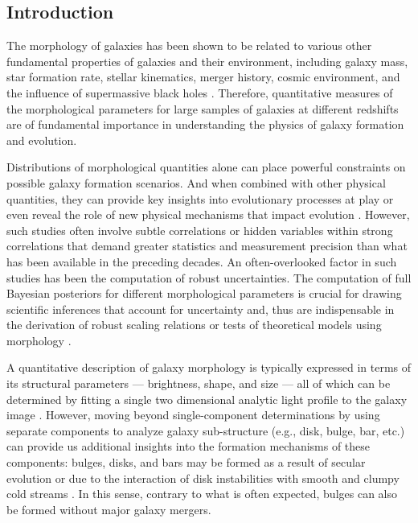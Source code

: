 \documentclass[linenumbers,twocolumn,twocolappendix]{aastex631}
\begin{document}
\begin{CJK*}{UTF8}{gbsn}
\section{Introduction} \label{sec:intro}

The morphology of galaxies has been shown to be related to various other fundamental properties of galaxies and their environment, including galaxy mass, star formation rate, stellar kinematics, merger history, cosmic environment, and the influence of supermassive black holes \citep[e.g.,][]{Bender1992DynamicallyProperties,Tremaine2002TheCorrelation,pozzetti_10, wuyts_11, Huertas-Company2016MassCANDELS,powell_17, shimakawa_2021, Dimauro2022CoincidenceGrowth}. Therefore, quantitative measures of the morphological parameters for large samples of galaxies at different redshifts are of fundamental importance in understanding the physics of galaxy formation and evolution. 

Distributions of morphological quantities alone can place powerful constraints on possible galaxy formation scenarios. And when combined with other physical quantities, they can provide key insights into evolutionary processes at play or even reveal the role of new physical  mechanisms that impact evolution \citep[e.g.,][]{Kauffmann2004TheGalaxies,Weinmann2006PropertiesMass,Schawinski2007TheGalaxies,vanderWel2008TheMass,Schawinski2014TheGalaxies}. However, such studies often involve subtle correlations or hidden variables within strong correlations that demand greater statistics and measurement precision than what has been available in the preceding decades. %
An often-overlooked factor in such studies has been the computation of robust uncertainties. The computation of full Bayesian posteriors for different morphological parameters is crucial for drawing scientific inferences that account for uncertainty and, thus are indispensable in 
the derivation of robust scaling relations  \citep[e.g.,][]{Bernardi2013TheProfile, vanderWel20143D-HST+CANDELS:3} or tests of theoretical models using morphology \citep[e.g.,][]{Schawinski2014TheGalaxies}.

A quantitative description of galaxy morphology is typically expressed in terms of its structural parameters --- brightness, shape, and size --- all of which can be determined by fitting a single two dimensional analytic light profile to the galaxy image \citep[e.g.,][]{vdw_12,tarsitano_18}. However, moving beyond single-component determinations by using separate components to analyze galaxy sub-structure (e.g., disk, bulge, bar, etc.) can provide us additional insights into the formation mechanisms of these components: bulges, disks, and bars may be formed as a result of secular evolution \citep[e.g.,][]{kormendy_1979,kormendy_2004, genzel_2008, sellwood_2014} or due to the interaction of disk instabilities with smooth and clumpy cold streams \citep[e.g.,][]{dekel_09a,dekel_09b}. In this sense, contrary to what is often expected, bulges can also be formed without major galaxy mergers. 


\end{CJK*}
\end{document}
